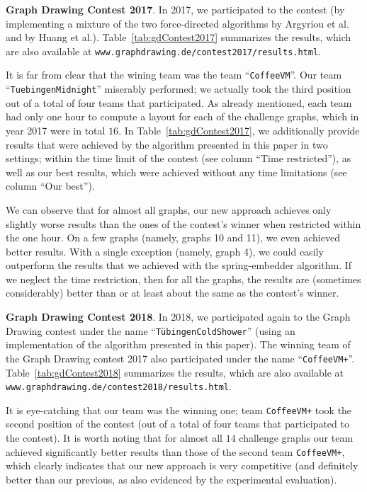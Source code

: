\documentclass{comjnl}
\newcommand{\myparagraph}[1]{\medskip\noindent\textbf{#1}.}
\begin{document}
\myparagraph{Graph Drawing Contest 2017} In 2017, we participated to the contest (by implementing a mixture of the two force-directed algorithms by Argyriou et al. and by Huang et al.). 
%
Table~\ref{tab:gdContest2017} summarizes the results, which are also available at \texttt{www.graphdrawing.de/contest2017/results.html}. 

It is far from clear that the wining team was the team  ``\texttt{CoffeeVM}''. Our team ``\texttt{TuebingenMidnight}''  miserably performed; we actually took the third position out of a total of four teams that participated. As already mentioned, each team had only one hour to compute a layout for each of the challenge graphs, which in year 2017 were in total $16$. In Table~\ref{tab:gdContest2017}, we additionally provide results that were achieved by the algorithm presented in this paper in two settings; within the time limit of the contest (see column ``Time restricted''), as well as our best results, which were achieved without any time limitations (see column ``Our best'').

We can observe that for almost all graphs, our new approach achieves only slightly worse results than the ones of the contest's winner when restricted within the one hour. On a few graphs (namely, graphs 10 and 11), we even achieved better results. With a single exception (namely, graph 4), we could easily outperform the results that we achieved with the spring-embedder algorithm. If we neglect the time restriction, then for all the graphs, the results  are (sometimes considerably) better than or at least about the same as the contest's winner. 

\myparagraph{Graph Drawing Contest 2018} In 2018, we participated again to the Graph Drawing contest under the name ``\texttt{T\"ubingenColdShower}'' (using an implementation of the algorithm presented in this paper). The winning team of the Graph Drawing contest 2017 also participated under the name ``\texttt{CoffeeVM+}''. Table~\ref{tab:gdContest2018} summarizes the results, which are also available at \texttt{www.graphdrawing.de/contest2018/results.html}. 

It is eye-catching that our team was the winning one; team \texttt{CoffeeVM+} took the second position of the contest (out of a total of four teams that participated to the contest). It is worth noting that for almost all $14$ challenge graphs our team achieved significantly better results than those of the second team \texttt{CoffeeVM+}, which clearly indicates that our new approach is very competitive (and definitely better than our previous,  as also evidenced by the experimental evaluation).
\end{document}
